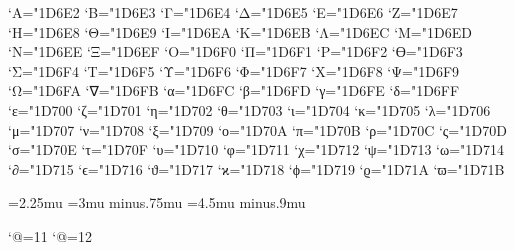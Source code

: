 \Umathcodenum`Α="1D6E2 \Umathcodenum`Β="1D6E3 \Umathcodenum`Γ="1D6E4
\Umathcodenum`Δ="1D6E5 \Umathcodenum`Ε="1D6E6 \Umathcodenum`Ζ="1D6E7
\Umathcodenum`Η="1D6E8 \Umathcodenum`Θ="1D6E9 \Umathcodenum`Ι="1D6EA
\Umathcodenum`Κ="1D6EB \Umathcodenum`Λ="1D6EC \Umathcodenum`Μ="1D6ED
\Umathcodenum`Ν="1D6EE \Umathcodenum`Ξ="1D6EF \Umathcodenum`Ο="1D6F0
\Umathcodenum`Π="1D6F1 \Umathcodenum`Ρ="1D6F2 \Umathcodenum`ϴ="1D6F3
\Umathcodenum`Σ="1D6F4 \Umathcodenum`Τ="1D6F5 \Umathcodenum`Υ="1D6F6
\Umathcodenum`Φ="1D6F7 \Umathcodenum`Χ="1D6F8 \Umathcodenum`Ψ="1D6F9
\Umathcodenum`Ω="1D6FA \Umathcodenum`∇="1D6FB
\Umathcodenum`α="1D6FC \Umathcodenum`β="1D6FD \Umathcodenum`γ="1D6FE
\Umathcodenum`δ="1D6FF \Umathcodenum`ε="1D700 \Umathcodenum`ζ="1D701
\Umathcodenum`η="1D702 \Umathcodenum`θ="1D703 \Umathcodenum`ι="1D704
\Umathcodenum`κ="1D705 \Umathcodenum`λ="1D706 \Umathcodenum`μ="1D707
\Umathcodenum`ν="1D708 \Umathcodenum`ξ="1D709 \Umathcodenum`ο="1D70A
\Umathcodenum`π="1D70B \Umathcodenum`ρ="1D70C \Umathcodenum`ς="1D70D
\Umathcodenum`σ="1D70E \Umathcodenum`τ="1D70F \Umathcodenum`υ="1D710
\Umathcodenum`φ="1D711 \Umathcodenum`χ="1D712 \Umathcodenum`ψ="1D713
\Umathcodenum`ω="1D714 \Umathcodenum`∂="1D715 \Umathcodenum`ϵ="1D716
\Umathcodenum`ϑ="1D717 \Umathcodenum`ϰ="1D718 \Umathcodenum`ϕ="1D719
\Umathcodenum`ϱ="1D71A \Umathcodenum`ϖ="1D71B

\thinmuskip=2.25mu
\medmuskip=3mu minus.75mu
\thickmuskip=4.5mu minus.9mu

\def\strut{\relax\vrule height.7\baselineskip depth.3\baselineskip width0pt }

\catcode`@=11
\def\n@space{\nulldelimiterspace=0pt }
\def\big#1{{\hbox{$\left#1\vbox  to 1.9743ex{}\right.\n@space$}}}
\def\Big#1{{\hbox{$\left#1\vbox  to 2.671ex{}\right.\n@space$}}}
\def\bigg#1{{\hbox{$\left#1\vbox to 3.3678ex{}\right.\n@space$}}}
\def\Bigg#1{{\hbox{$\left#1\vbox to 4.0646ex{}\right.\n@space$}}}
\catcode`@=12

